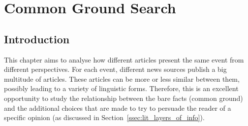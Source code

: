\chapter{\statusgreen Common Ground Search}
\label{chap:common_ground_search}



\section{\statusgreen Introduction}


This chapter aims to analyse how different articles present the same event from different perspectives.
For each \gls{event}, different news sources publish a big multitude of articles.
These articles can be more or less similar between them, possibly leading to a variety of linguistic forms. %
Therefore, this is an excellent opportunity to study the relationship between the bare facts (common ground) and the additional choices that are made to try to persuade the reader of a specific opinion (as discussed in Section~\ref{ssec:lit_layers_of_info}). %

